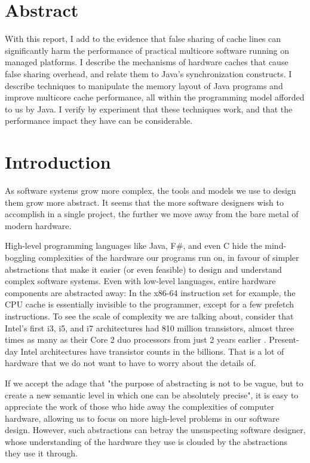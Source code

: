 \chapter{Abstract}
With this report, I add to the evidence that false sharing of cache lines
can significantly harm the performance of practical multicore software running
on managed platforms. I describe the mechanisms of hardware caches that cause
false sharing overhead, and relate them to Java's synchronization constructs. I
describe techniques to manipulate the memory layout of Java programs and improve
multicore cache performance, all within the programming model afforded to us by
Java. I verify by experiment that these techniques work, and that the
performance impact they have can be considerable.

\chapter{Introduction}
As software systems grow more complex, the tools and models we use to design
them grow more abstract. It seems that the more software designers wish to
accomplish in a single project, the further we move away from the bare metal of
modern hardware.

High-level programming languages like Java, F\#, and even C hide the
mind-boggling complexities of the hardware our programs run on, in favour of
simpler abstractions that make it easier (or even feasible) to design and
understand complex software systems. Even with low-level languages, entire
hardware components are abstracted away: In the x86-64 instruction set for
example, the CPU cache is essentially invisible to the programmer, except for a
few prefetch instructions. 
To see the scale of
complexity we are talking about, consider that Intel's first i3, i5, and i7
architectures had 810 million transistors, almost three times as many as their
Core 2 duo processors from just 2 years earlier \cite{plc}. Present-day
Intel architectures have transistor counts in the billions. That is a
lot of hardware that we do not want to have to worry about the details of.

If we accept the adage that "the purpose of abstracting is not to be vague, but
to create a new semantic level in which one can be absolutely
precise"\cite{dijkstra}, it is easy to appreciate the work of those who hide
away the complexities of computer hardware, allowing us to focus on more
high-level problems in our software design.
However, such abstractions can betray the unsuspecting software designer, whose
understanding of the hardware they use is clouded by the abstractions they use
it through.

